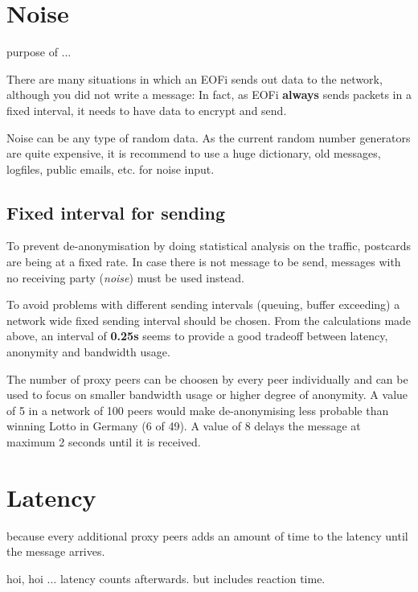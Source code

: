 \section{Noise}
\label{noise}

purpose of ... 

There are many situations in which an EOFi sends out data to the network,
although you did not write a message: In fact, as EOFi \textbf{always}
sends packets in a fixed interval, it needs to have data to encrypt and send.

Noise can be any type of random data. As the current random number generators
are quite expensive, it is recommend to use a huge dictionary, old 
messages, logfiles, public emails, etc. for noise input.

\subsection{Fixed interval for sending}
To prevent de-anonymisation by doing statistical analysis on the traffic,
postcards are being at a fixed rate.
In case there is not message to be send, messages with no receiving
party (\textit{noise}) must be used instead.

To avoid problems with different sending intervals
(queuing, buffer exceeding) a network wide fixed sending interval
should be chosen. From the calculations made above, an interval
of \textbf{0.25s} seems to provide a good tradeoff between
latency, anonymity and bandwidth usage.

The number of proxy peers can be choosen by every peer individually
and can be used to focus on smaller bandwidth usage or higher degree
of anonymity. A value of 5 in a network of 100 peers
would make de-anonymising less probable than winning Lotto in Germany
(6 of 49). A value of 8 delays the message at maximum 2 seconds until
it is received.

\section{Latency}
\label{latency}

because every
additional proxy peers adds an amount of time to the latency until the
message arrives.

hoi, hoi ... latency counts afterwards. but includes reaction time.

